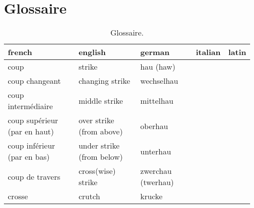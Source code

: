 \chapter{Glossaire}

\begin{table}[h]
	\centering
	\begin{tabular}{lllll}
		french &
			english &
			german &
			italian &
			latin \\
		\hline
		coup &
			strike &
			hau (haw) &
			&
			\\
		coup changeant &
			changing strike &
			wechselhau &
			&
			\\
		coup intermédiaire &
			middle strike &
			mittelhau &
			&
			\\
		coup supérieur (par en haut) &
			over strike (from above) &
			oberhau &
			&
			\\
		coup inférieur (par en bas) &
			under strike (from below) &
			unterhau &
			&
			\\
		coup de travers &
			cross(wise) strike &
			zwerchau (twerhau) &
			&
			\\
		crosse &
		crutch &
		krucke &
		&
	\end{tabular}
	\caption{Glossaire.}
\end{table}


